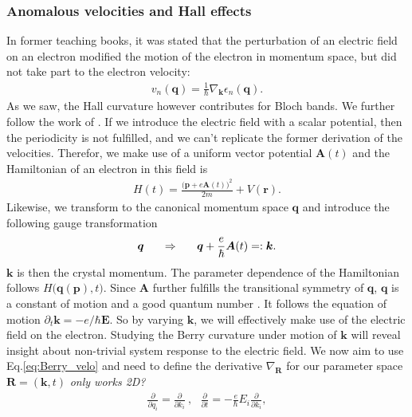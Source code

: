 \documentclass[../main]{subfiles}
\begin{document}
    \subsubsection{Anomalous velocities and Hall effects}
    In former teaching books, it was stated that the perturbation of an electric field on an electron modified the motion of the electron in momentum space,
    but did not take part to the electron velocity:
    \begin{align*}
        v_n(\bm{q}) =  \frac{1}{\hbar}\nabla_{\bm{k}}\epsilon_n(\bm{q}).
    \end{align*}
    As we saw, the Hall curvature however contributes for Bloch bands. We further follow the work of \cite{Xiao2010-lt}.
    If we introduce the electric field with a scalar potential, then the periodicity is not fulfilled, and we can't replicate the former derivation of the velocities.
    Therefor, we make use of a uniform vector potential $\bm{A}(t)$ and the Hamiltonian of an electron in this field is
    \begin{align*}
        H(t) = \frac{\bigl(\bm{p} +e\bm{A}(t)\bigr)^2}{2m} + V(\bm{r}).
    \end{align*}
    Likewise, we transform to the canonical momentum space $\bm{q}$ and introduce the following gauge transformation
    \begin{align*}
        \bm{q} \hspace*{16pt} \Rightarrow \hspace{16pt}\bm{q} +\frac{e}{\hbar}\bm{A}(t) =:\bm{k}.
    \end{align*}
    $\bm{k}$ is then the crystal momentum. The parameter dependence of the Hamiltonian follows $H\bigl(\bm{q}(\bm{p}),t\bigr)$. Since $\bm{A}$ further fulfills the transitional symmetry of $\bm{q}$,
    $\bm{q}$ is a constant of motion and a good quantum number \cite{Xiao2010-lt}. It follows the equation of motion $\partial_t\bm{k} = -e/\hbar\bm{E}$. So by varying $\bm{k}$, we will effectively make use of the electric field on 
    the electron. Studying the Berry curvature under motion of $\bm{k}$ will reveal insight about non-trivial system response to the electric field. We now aim to use Eq.\ref{eq:Berry_velo} and need to define the derivative 
    $\nabla_{\bm{R}}$ for our parameter space $\bm{R}=(\bm{k},t)$ \textit{only works 2D?}
    \begin{align*}
        \frac{\partial}{\partial q_i} = \frac{\partial}{\partial k_i}~,~~ ~ \frac{\partial}{\partial t} = -\frac{e}{\hbar} E_i\frac{\partial}{\partial k_i},
    \end{align*}
\end{document}
